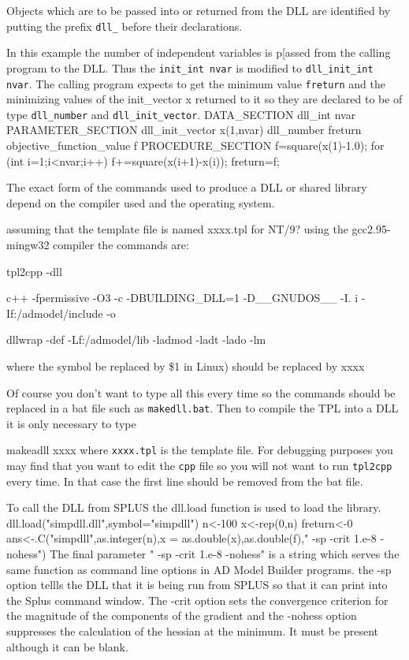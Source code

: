 Objects which are to be passed into or returned from the
DLL are identified by putting the prefix {\tt dll\_}
before their declarations.

In this  example the number of independent variables
is p[assed from the calling program to the DLL.
Thus the {\tt init\_int nvar} is modified to 
{\tt dll\_init\_int nvar}. The calling program
expects to get the minimum value {\tt freturn}
and the minimizing values
of the {init\_vector x} returned to it so they are declared to be
of type {\tt dll\_number} and {\tt dll\_init\_vector}.
\beginexample
DATA_SECTION
  dll_int nvar
PARAMETER_SECTION
  dll_init_vector x(1,nvar)
  dll_number freturn
  objective_function_value f
PROCEDURE_SECTION
  f=square(x(1)-1.0);
  for (int i=1;i<nvar;i++)
  {
    f+=square(x(i+1)-x(i));
  }
  freturn=f;
\endexample


The exact form of the commands used to produce a DLL or shared library
depend on the compiler used and the operating system.

assuming that the template file is named xxxx.tpl
for NT/9? using the gcc2.95-mingw32 compiler the 
commands are:

\beginexample
tpl2cpp -dll  %

c++ -fpermissive -O3 -c -DBUILDING_DLL=1 -D__GNUDOS__ -I. i
  -If:/admodel/include   -o %

dllwrap -def %
   -Lf:/admodel/lib -ladmod -ladt -lado -lm 

\endexample
\noindent where the symbol %
be replaced by \$1 in Linux) should be replaced by xxxx

Of course you don't want to type all this every time so the commands
should be replaced in a bat file
such as {\tt makedll.bat}.
Then to compile the TPL into a DLL it is only necessary to type

\beginexample
makeadll xxxx
\endexample
\noindent where {\tt xxxx.tpl} is the template file.
For debugging purposes you may find that you want to edit the
{\tt cpp} file so you will not want to run {\tt tpl2cpp}
every time. In that case the first line should be removed from
the bat file.


To call the  DLL from SPLUS the dll.load function is used to
load the library. 
\beginexample
dll.load("simpdll.dll",symbol="simpdll")
n<-100
x<-rep(0,n)
freturn<-0
ans<-.C("simpdll",as.integer(n),x = as.double(x),as.double(f)," -sp -crit 1.e-8 -nohess")
\endexample
The final parameter " -sp -crit 1.e-8 -nohess" is a string which serves the same function as command
line options in AD Model Builder programs. 
the -sp option tellls the DLL that it is being run from SPLUS so that
it can print into the Splus command window. The -crit option sets the
convergence criterion for the magnitude of the components of the
gradient and the -nohess option suppresses the calculation of the 
hessian at the minimum. It must be present although it can be blank.

